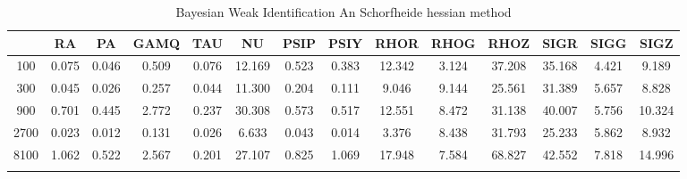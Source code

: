 \documentclass[a4paper,10pt]{article}
\begin{document}
\centering
\begin{longtable}{cccccccccccccc}
\toprule
 & RA & PA & GAMQ & TAU & NU & PSIP & PSIY & RHOR & RHOG & RHOZ & SIGR & SIGG & SIGZ \\
\midrule
100 & 0.075 & 0.046 & 0.509 & 0.076 & 12.169 & 0.523 & 0.383 & 12.342 & 3.124 & 37.208 & 35.168 & 4.421 & 9.189 \\
300 & 0.045 & 0.026 & 0.257 & 0.044 & 11.300 & 0.204 & 0.111 & 9.046 & 9.144 & 25.561 & 31.389 & 5.657 & 8.828 \\
900 & 0.701 & 0.445 & 2.772 & 0.237 & 30.308 & 0.573 & 0.517 & 12.551 & 8.472 & 31.138 & 40.007 & 5.756 & 10.324 \\
2700 & 0.023 & 0.012 & 0.131 & 0.026 & 6.633 & 0.043 & 0.014 & 3.376 & 8.438 & 31.793 & 25.233 & 5.862 & 8.932 \\
8100 & 1.062 & 0.522 & 2.567 & 0.201 & 27.107 & 0.825 & 1.069 & 17.948 & 7.584 & 68.827 & 42.552 & 7.818 & 14.996 \\
\bottomrule
\caption{Bayesian Weak Identification An Schorfheide hessian method}
\label{table:tbl:WeakAnScho_hessian}
\end{longtable}
\end{document}

